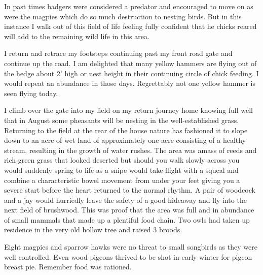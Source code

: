 In past times badgers were considered a predator and encouraged to move on as
were the magpies which do so much destruction to nesting birds. But in this
instance I walk out of this field of life feeling fully confident that he
chicks reared will add to the remaining wild life in this area.

I return and retrace my footsteps continuing past my front road gate and
continue up the road. I am delighted that many yellow hammers are flying out
of the hedge about 2' high or nest height in their continuing circle of chick
feeding. I would repeat an abundance in those days. Regrettably not one
yellow hammer is seen flying today.

I climb over the gate into my field on my return journey home knowing full well
that in August some pheasants will be nesting in the well-established grass.
Returning to the field at the rear of the house nature has fashioned it to
slope down to an acre of wet land of approximately one acre consisting of a
healthy stream, resulting in the growth of water rushes. The area was amass of
reeds and rich green grass that looked deserted but should you walk slowly
across you would suddenly spring to life as a snipe would take flight with a
squeal and combine a characteristic bowel movement from under your feet giving
you a severe start before the heart returned to the normal rhythm. A pair of
woodcock and a jay would hurriedly leave the safety of a good hideaway and fly
into the next field of brushwood. This was proof that the area was full and in
abundance of small mammals that made up a plentiful food chain. Two owls had
taken up residence in the very old hollow tree and raised 3 broods.

Eight magpies and sparrow hawks were no threat to small songbirds as they were
well controlled. Even wood pigeons thrived to be shot in early winter for
pigeon breast pie. Remember food was rationed.

